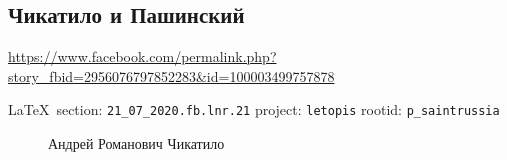  
 

\subsection{Чикатило и Пашинский}
\label{sec:21_07_2020.fb.lnr.21}
\url{https://www.facebook.com/permalink.php?story_fbid=2956076797852283&id=100003499757878}
  
\vspace{0.5cm}
{\small\LaTeX~section: \verb|21_07_2020.fb.lnr.21| project: \verb|letopis| rootid: \verb|p_saintrussia|}


\begin{figure}[ht]
 \centering
 \caption{Андрей Романович Чикатило}
 \label{fig:}
\end{figure}
\vspace{0.5cm}
  
